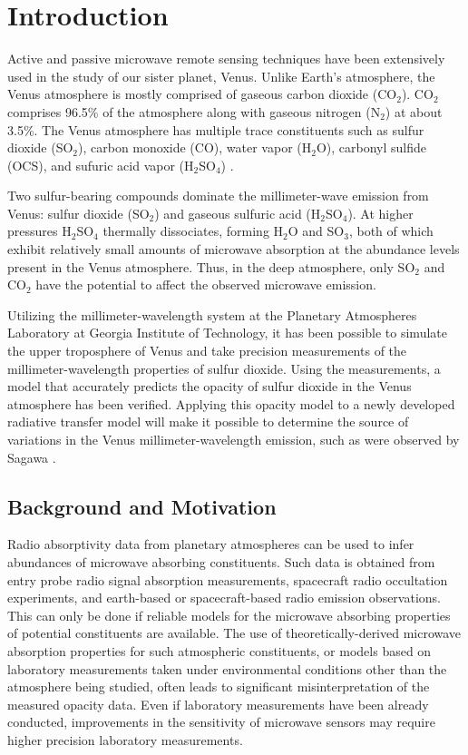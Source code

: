\chapter{Introduction}

Active and passive microwave remote sensing techniques have been extensively used in the study of our sister planet, Venus. Unlike Earth's atmosphere, the Venus atmosphere is mostly comprised of gaseous carbon dioxide (CO$_2$). CO$_2$ comprises 96.5\% of the atmosphere along with gaseous nitrogen (N$_2$) at about 3.5\%. The Venus atmosphere has multiple trace constituents such as sulfur dioxide (SO$_2$), carbon monoxide (CO), water vapor (H$_2$O), carbonyl sulfide (OCS), and sufuric acid vapor (H$_2$SO$_4$) \cite{Suleiman-thesis}.

Two sulfur-bearing compounds dominate the millimeter-wave emission from Venus: sulfur dioxide (SO$_2$) and gaseous sulfuric acid (H$_2$SO$_4$). At higher pressures H$_2$SO$_4$ thermally dissociates, forming H$_2$O and SO$_3$, both of which exhibit relatively small amounts of microwave absorption at the abundance levels present in the Venus atmosphere. Thus, in the deep atmosphere, only SO$_2$ and CO$_2$ have the potential to affect the observed microwave emission.

Utilizing the millimeter-wavelength system at the Planetary Atmospheres Laboratory at Georgia Institute of Technology, it has been possible to simulate the upper troposphere of Venus and take precision measurements of the millimeter-wavelength properties of sulfur dioxide. Using the measurements, a model that accurately predicts the opacity of sulfur dioxide in the Venus atmosphere has been verified. Applying this opacity model to a newly developed radiative transfer model will make it possible to determine the source of variations in the Venus millimeter-wavelength emission, such as were observed by Sagawa \cite{Sagawa-2008}.

\section{Background and Motivation}

Radio absorptivity data from planetary atmospheres can be used to infer abundances of microwave absorbing constituents. Such data is obtained from entry probe radio signal absorption measurements, spacecraft radio occultation experiments, and earth-based or spacecraft-based radio emission observations. This can only be done if reliable models for the microwave absorbing properties of potential constituents are available. The use of theoretically-derived microwave absorption properties for such atmospheric constituents, or models based on laboratory measurements taken under environmental conditions other than the atmosphere being studied, often leads to significant misinterpretation of the measured opacity data. Even if laboratory measurements have been already conducted, improvements in the sensitivity of microwave sensors may require higher precision laboratory measurements. 


